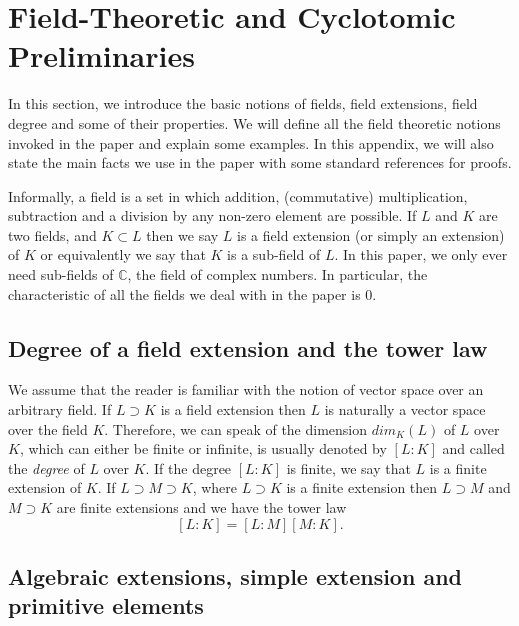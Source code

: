 \documentclass[a4paper,onecolumn,accepted=2026-04-08,10pt]{quantumarticle}
\theoremstyle{definition}
\begin{document}
\appendix
\section{Field-Theoretic and Cyclotomic Preliminaries}\label{sec: appendix}


In this section, we introduce the basic notions of fields, field extensions, field degree and some of their properties. We will define all the field theoretic notions invoked in the paper and explain some examples. In this appendix, we will also state the main facts we use in the paper with some standard references for proofs. 

Informally, a field is a set in which addition, (commutative) multiplication, subtraction and a division by any non-zero element are possible. If $L$ and $K$ are two fields, and $K \subset L$ then we say $L$ is a field extension (or simply an extension) of $K$ or equivalently we say that $K$ is a sub-field of $L$. In this paper, we only ever need sub-fields of $\mathbb{C}$, the field of complex numbers. In particular, the characteristic of all the fields we deal with in the paper is $0.$

\subsection{Degree of a field extension and the tower law}

We assume that the reader is familiar with the notion of vector space over an arbitrary field. If $L \supset K$ is a field extension then $L$ is naturally a vector space over the field $K$. Therefore, we can speak of the dimension $dim_{K}(L)$ of $L$ over $K$, which can either be finite or infinite, is usually denoted by $[L:K]$ and called the \textit{degree} of $L$ over $K$. If the degree $[L:K]$ is finite, we say that $L$ is a finite extension of $K$. If $L \supset M \supset K$, where $L\supset K$ is a finite extension then $L \supset M$ and $M \supset K$ are finite extensions and we have the tower law  $$[L:K] = [L:M] [M:K].$$


\subsection{Algebraic extensions, simple extension and primitive elements}\label{A1:algebraic externsions}
\end{document}
